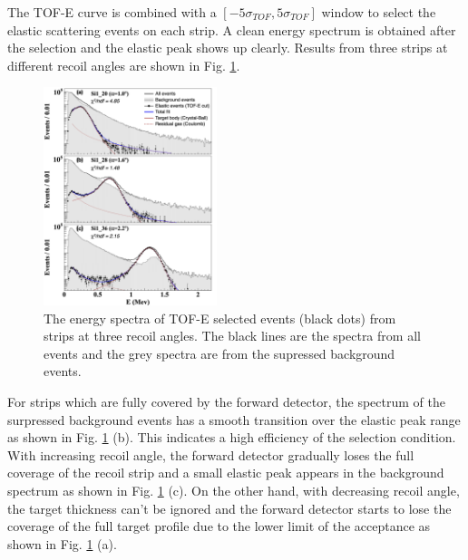 \documentclass[number,5p]{elsarticle}
\begin{document}

The TOF-E curve is combined with a $[-5\sigma_{TOF}, 5\sigma_{TOF}]$ window to select the elastic scattering events on each strip.
A clean energy spectrum is obtained after the selection and the elastic peak shows up clearly.
Results from three strips at different recoil angles are shown in Fig. \ref{fig:cut}.
\begin{figure}[b!]
  \centering
  \includegraphics[width=0.45\textwidth]{./tofe_cut_comparison.png}
  \caption{The energy spectra of TOF-E selected events (black dots) from strips at
    three recoil angles. The black lines are the spectra from all events and the grey spectra
    are from the supressed background events.}
  \label{fig:cut}
\end{figure}
For strips which are fully covered by the forward detector, the spectrum of the
surpressed background events has a smooth transition over the elastic peak range
as shown in Fig. \ref{fig:cut} (b).
This indicates a high efficiency of the selection condition.
With increasing recoil angle, the forward detector gradually loses the full coverage
of the recoil strip and a small elastic peak appears in the background spectrum
as shown in Fig. \ref{fig:cut} (c).
On the other hand, with decreasing recoil angle, the target thickness can't be
ignored and the forward detector starts to lose the coverage of the full target profile due
to the lower limit of the acceptance as shown in Fig. \ref{fig:cut} (a).
\end{document}
